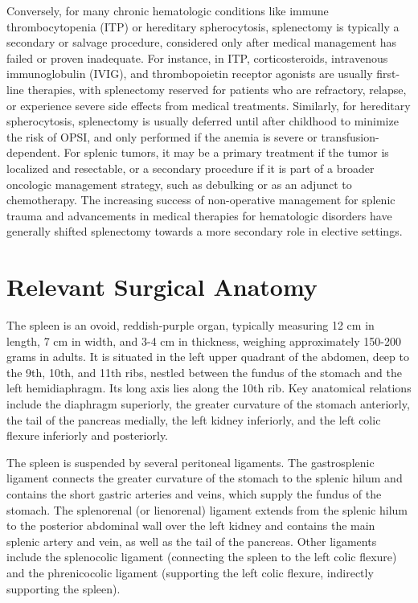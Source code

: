 Conversely, for many chronic hematologic conditions like immune thrombocytopenia (ITP) or hereditary spherocytosis, splenectomy is typically a secondary or salvage procedure, considered only after medical management has failed or proven inadequate. For instance, in ITP, corticosteroids, intravenous immunoglobulin (IVIG), and thrombopoietin receptor agonists are usually first-line therapies, with splenectomy reserved for patients who are refractory, relapse, or experience severe side effects from medical treatments. Similarly, for hereditary spherocytosis, splenectomy is usually deferred until after childhood to minimize the risk of OPSI, and only performed if the anemia is severe or transfusion-dependent. For splenic tumors, it may be a primary treatment if the tumor is localized and resectable, or a secondary procedure if it is part of a broader oncologic management strategy, such as debulking or as an adjunct to chemotherapy. The increasing success of non-operative management for splenic trauma and advancements in medical therapies for hematologic disorders have generally shifted splenectomy towards a more secondary role in elective settings.

\section*{Relevant Surgical Anatomy}
The spleen is an ovoid, reddish-purple organ, typically measuring 12 cm in length, 7 cm in width, and 3-4 cm in thickness, weighing approximately 150-200 grams in adults. It is situated in the left upper quadrant of the abdomen, deep to the 9th, 10th, and 11th ribs, nestled between the fundus of the stomach and the left hemidiaphragm. Its long axis lies along the 10th rib. Key anatomical relations include the diaphragm superiorly, the greater curvature of the stomach anteriorly, the tail of the pancreas medially, the left kidney inferiorly, and the left colic flexure inferiorly and posteriorly.

The spleen is suspended by several peritoneal ligaments. The gastrosplenic ligament connects the greater curvature of the stomach to the splenic hilum and contains the short gastric arteries and veins, which supply the fundus of the stomach. The splenorenal (or lienorenal) ligament extends from the splenic hilum to the posterior abdominal wall over the left kidney and contains the main splenic artery and vein, as well as the tail of the pancreas. Other ligaments include the splenocolic ligament (connecting the spleen to the left colic flexure) and the phrenicocolic ligament (supporting the left colic flexure, indirectly supporting the spleen). 

